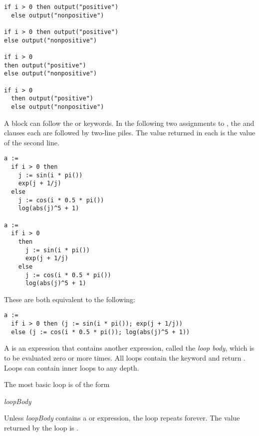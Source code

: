 {\begin{verbatim}
if i > 0 then output("positive")
  else output("nonpositive")

if i > 0 then output("positive")
else output("nonpositive")

if i > 0
then output("positive")
else output("nonpositive")

if i > 0
  then output("positive")
  else output("nonpositive")
\end{verbatim}

A block can follow the  or  keywords.
In the following two assignments to , the  and 
clauses each are followed by two-line piles.
The value returned in each is the value of the second line.

\begin{verbatim}
a :=
  if i > 0 then
    j := sin(i * pi())
    exp(j + 1/j)
  else
    j := cos(i * 0.5 * pi())
    log(abs(j)^5 + 1)

a :=
  if i > 0
    then
      j := sin(i * pi())
      exp(j + 1/j)
    else
      j := cos(i * 0.5 * pi())
      log(abs(j)^5 + 1)
\end{verbatim}
These are both equivalent to the following:
\begin{verbatim}
a :=
  if i > 0 then (j := sin(i * pi()); exp(j + 1/j))
  else (j := cos(i * 0.5 * pi()); log(abs(j)^5 + 1))
\end{verbatim}


A  is an expression that contains another expression,
called the {\it loop body}, which is to be evaluated zero or more
times.
All loops contain the  keyword and return \void{}.
Loops can contain inner loops to any depth.

\beginImportant
The most basic loop is of the form
\begin{center}
 {\it loopBody}
\end{center}
Unless {\it loopBody} contains a  or  expression,
the loop repeats forever.
The value returned by the loop is \void{}.
\endImportant


}
